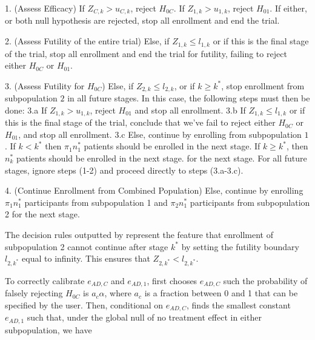 \documentclass[article]{jss}
\begin{document}
\begin{description}
\item 1. (Assess Efficacy) If $Z_{C,k} > u_{C,k}$, reject $H_{0C}$. If $Z_{1,k}>u_{1,k}$, reject $H_{01}$. If either, or both null hypothesis are rejected, stop all enrollment and end the trial.
\item 2. (Assess Futility of the entire trial) Else, if $Z_{1,k} ≤ l_{1,k}$ or if this is the final stage of the trial, stop all enrollment and end the trial for futility, failing to reject either $H_{0C}$ or $H_{01}$.
\item 3. (Assess Futility for $H_{0C}$) Else, if $Z_{2,k} ≤ l_{2,k}$, or if $k\geq k^*$, stop enrollment from subpopulation $2$ in all future stages. In this case, the following steps must then be done:
	\subitem  3.a If $Z_{1,k} > u_{1,k}$, reject $H_{01}$ and stop all enrollment.
	\subitem  3.b If $Z_{1,k} ≤ l_{1,k}$ or if this is the final stage of the trial, conclude that we've fail to reject either $H_{0C}$ or $H_{01}$, and stop all enrollment.
	\subitem  3.c Else, continue by enrolling from subpopulation $1$. If $k < k^*$ then $π_1n_1^*$ patients should be enrolled in the next stage. If $k \geq k^*$, then $n_k^*$ patients should be enrolled in the next stage. for the next stage. For all future stages, ignore steps (1-2) and proceed directly to steps (3.a-3.c).
\item  4. (Continue Enrollment from Combined Population) Else, continue by enrolling $\pi_1 n_1^*$ participants from subpopulation 1 and $\pi_2 n_1^*$ participants from subpopulation 2 for the next stage.
\end{description}

The decision rules outputted by  represent the feature that enrollment of subpopulation 2 cannot continue after stage $k^*$ by setting the futility boundary $l_{2,k^*}$ equal to infinity. This ensures that $Z_{2,k^*}<l_{2,k^*}$. 

To correctly calibrate $e_{AD,C}$  and $e_{AD,1}$,  first chooses $e_{AD,C}$ such the probability of falsely rejecting $H_{0C}$ is $a_c α$, where $a_c$ is a fraction between 0 and 1 that can be specified by the user. Then, conditional on $e_{AD,C}$,  finds the smallest constant $e_{AD,1}$ such that, under the global null of no treatment effect in either subpopulation, we have %
\end{document}
